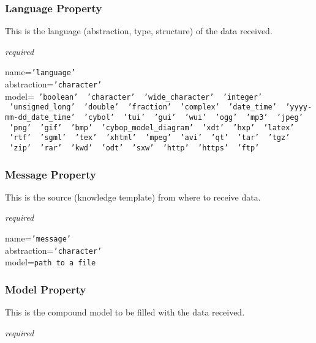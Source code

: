 \subsubsection{Language Property}

This is the language (abstraction, type, structure) of the data received.

\emph{required}

name=\texttt{'language'}\\
abstraction=\texttt{'character'}\\
model=\texttt{
    'boolean'
    \vline\ 'character'
    \vline\ 'wide\_character'
    \vline\ 'integer'
    \vline\ 'unsigned\_long'
    \vline\ 'double'
    \vline\ 'fraction'
    \vline\ 'complex'
    \vline\ 'date\_time'
    \vline\ 'yyyy-mm-dd\_date\_time'
    \vline\ 'cybol'
    \vline\ 'tui'
    \vline\ 'gui'
    \vline\ 'wui'
    \vline\ 'ogg'
    \vline\ 'mp3'
    \vline\ 'jpeg'
    \vline\ 'png'
    \vline\ 'gif'
    \vline\ 'bmp'
    \vline\ 'cybop\_model\_diagram'
    \vline\ 'xdt'
    \vline\ 'hxp'
    \vline\ 'latex'
    \vline\ 'rtf'
    \vline\ 'sgml'
    \vline\ 'tex'
    \vline\ 'xhtml'
    \vline\ 'mpeg'
    \vline\ 'avi'
    \vline\ 'qt'
    \vline\ 'tar'
    \vline\ 'tgz'
    \vline\ 'zip'
    \vline\ 'rar'
    \vline\ 'kwd'
    \vline\ 'odt'
    \vline\ 'sxw'
    \vline\ 'http'
    \vline\ 'https'
    \vline\ 'ftp'
}

\subsubsection{Message Property}

This is the source (knowledge template) from where to receive data.

\emph{required}

name=\texttt{'message'}\\
abstraction=\texttt{'character'}\\
model=\texttt{path to a file}

\subsubsection{Model Property}

This is the compound model to be filled with the data received.

\emph{required}

